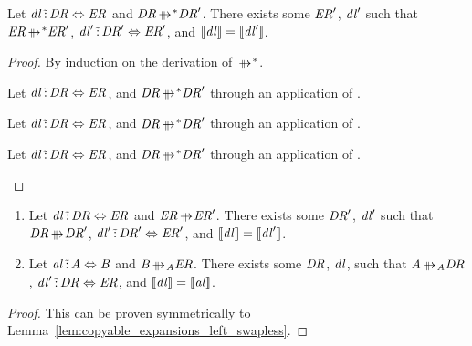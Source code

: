 \documentclass[numbers,10pt,preprint\ifanon ,nocopyrightspace\fi]{sigplanconf}
\begin{document}
\begin{lemma}
  \label{lem:copyable_expansions_left_swapless_star}\leavevmode
  Let $\mathit{dl} \,\tilde{:}\, \mathit{DR} \Leftrightarrow
  \mathit{ER}$ and $\DNFRegex \StarOf{\ParallelRewrite} \DNFRegex'$.  There
  exists some
  $\mathit{ER}'$, $\mathit{dl}'$ such that $\DNFRegexAlt
  \StarOf{\ParallelRewrite} \DNFRegexAlt'$,
  $\mathit{dl}' \,\tilde{:}\,
  \mathit{DR}' \Leftrightarrow \mathit{ER}'$, and $[ \! [\mathit{dl}] \! ] =
  [ \! [\mathit{dl}'] \! ]$.
\end{lemma}
\begin{proof}
  By induction on the derivation of $\StarOf{\ParallelRewrite}$.
  \begin{case}[\ReflexivityRule{}]
    Let $\mathit{dl} \,\tilde{:}\, \mathit{DR} \Leftrightarrow \mathit{ER}$, and
    $\DNFRegex\StarOf{\ParallelRewrite}\DNFRegex'$ through an application of
    \DNFReorderRule{}.
  \end{case}

  \begin{case}[\BaseRule{}]
    Let $\mathit{dl} \,\tilde{:}\, \mathit{DR} \Leftrightarrow \mathit{ER}$, and
    $\DNFRegex\StarOf{\ParallelRewrite}\DNFRegex'$ through an application of
    \DNFReorderRule{}.
  \end{case}

  \begin{case}[\TransitivityRule{}]
    Let $\mathit{dl} \,\tilde{:}\, \mathit{DR} \Leftrightarrow \mathit{ER}$, and
    $\DNFRegex\StarOf{\ParallelRewrite}\DNFRegex'$ through an application of
    \DNFReorderRule{}.
  \end{case}
\end{proof}

\begin{lemma}
  \label{lem:copyable_expansions_right_swapless}\leavevmode
  \begin{enumerate}
  \item Let $\mathit{dl} \,\tilde{:}\, \mathit{DR} \Leftrightarrow
    \mathit{ER}$ and $\DNFRegexAlt \ParallelRewrite \DNFRegexAlt'$.  There exists some
    $\mathit{DR}'$, $\mathit{dl}'$ such that $\DNFRegex \ParallelRewrite
    \DNFRegex'$,
    $\mathit{dl}' \,\tilde{:}\,
    \mathit{DR}' \Leftrightarrow \mathit{ER}'$, and $[ \! [\mathit{dl}] \! ] =
    [ \! [\mathit{dl}'] \! ]$.
  \item Let $\mathit{al} \,\tilde{:}\, \mathit{A} \Leftrightarrow \mathit{B}$ and
    $\AtomAlt \ParallelRewriteAtom \DNFRegexAlt$.  There exists some $\mathit{DR}$,
    $\mathit{dl}$, such that $\Atom \ParallelRewriteAtom \DNFRegex$,
    $\mathit{dl}' \,\tilde{:}\, \mathit{DR}
    \Leftrightarrow \mathit{ER}$, and $[ \! [\mathit{dl}] \! ] =
    [ \! [\mathit{al}] \! ]$.
  \end{enumerate}
\end{lemma}
\begin{proof}
  This can be proven symmetrically to Lemma~\ref{lem:copyable_expansions_left_swapless}.
\end{proof}
\end{document}

